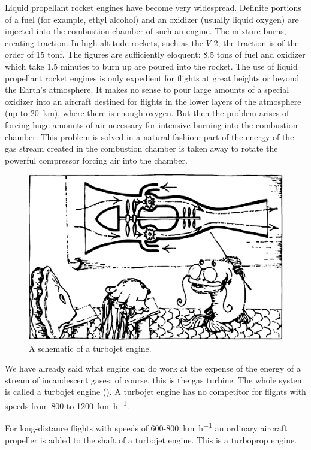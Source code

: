Liquid propellant rocket engines have become very widespread. Definite portions of a fuel (for example, ethyl alcohol) and an oxidizer (usually liquid oxygen) are injected into the combustion chamber of such an engine. The mixture burns, creating traction. In high-altitude rockets, such as the $V$-2, the traction is of the order of 15 tonf. The figures are sufficiently eloquent: 8.5 tons of fuel and oxidizer which take 1.5 minutes to burn up are poured into the rocket. The use of liquid pro­pellant rocket engines is only expedient for flights at great heights or beyond the Earth’s atmosphere. It makes no sense to pour large amounts of a special oxidizer into an aircraft destined for flights in the lower layers of the atmosphere (up to \SI{20}{\kilo\meter}), where there is enough oxygen. But then the problem arises of forcing huge amounts of air necessary for intensive burning into the combustion chamber. This problem is solved in a natural fashion: part of the energy of the gas stream created in the com­bustion chamber is taken away to rotate the powerful compressor forcing air into the chamber.
\begin{figure}[!ht]
\centering
\includegraphics[width=\textwidth]{figures/fig-07-04.pdf}
\caption{A schematic of a turbojet engine.}
\label{fig-7.4}
\end{figure}
We have already said what engine can do work at the expense of the energy of a stream of incandescent gases; of course, this is the gas turbine. The whole system is called a turbojet engine (). A turbojet engine has no competitor for flights with speeds from 800 to \SI{1200}{\kilo\meter\per\hour}.

For long-distance flights with speeds of 600-\SI{800}{\kilo\meter\per\hour} an ordinary aircraft propeller is added to the shaft of a turbojet engine. This is a turboprop engine.

